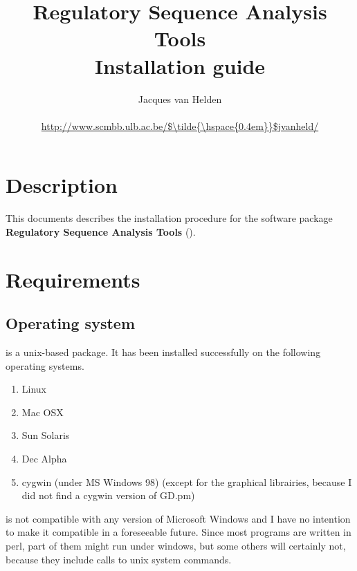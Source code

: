 \documentclass{article}
\begin{document}
\title{Regulatory Sequence Analysis Tools \\
Installation guide}

\author{
	Jacques van Helden \\
	 \\
	\url{http://www.scmbb.ulb.ac.be/$\tilde{\hspace{0.4em}}$jvanheld/} \\
	\scmbb 
}


\maketitle

\newpage
\tableofcontents
\newpage

\section{Description}

This documents describes the installation procedure for the software
package \textbf{Regulatory Sequence Analysis Tools} (\RSAT).

\section{Requirements}

\subsection{Operating system}

\RSAT is a unix-based package. It has been installed successfully on
the following operating systems.

\begin{enumerate}
\item Linux

\item Mac OSX

\item Sun Solaris

\item Dec Alpha

\item cygwin (under MS Windows 98) (except for the graphical
librairies, because I did not find a cygwin version of GD.pm)

\end{enumerate}

\RSAT is not compatible with any version of Microsoft Windows and I
have no intention to make it compatible in a foreseeable future. Since
most programs are written in perl, part of them might run under
windows, but some others will certainly not, because they include
calls to unix system commands.
\end{document}
